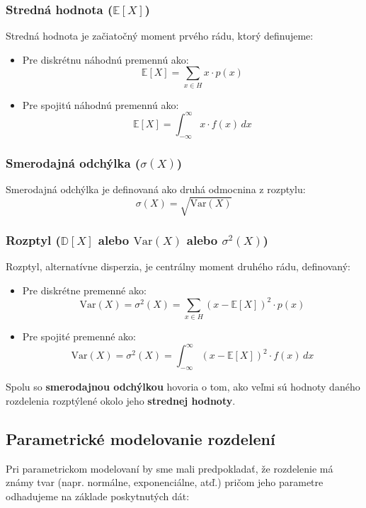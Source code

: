 \subsubsection{Stredná hodnota ($\mathbb{E}[X]$)}

Stredná hodnota je začiatočný moment prvého rádu, ktorý definujeme:

\begin{itemize}
  \item Pre diskrétnu náhodnú premennú ako:
  \[
  \mathbb{E}[X] = \sum_{x \in H} x \cdot p(x)
  \]
  \item Pre spojitú náhodnú premennú ako:
  \[
  \mathbb{E}[X] = \int_{-\infty}^{\infty} x \cdot f(x) \, dx
  \]
\end{itemize}

\subsubsection{Smerodajná odchýlka ($\sigma(X)$)}

Smerodajná odchýlka je definovaná ako druhá odmocnina z rozptylu:
\[
\sigma(X) = \sqrt{\mathrm{Var}(X)}
\]

\subsubsection{Rozptyl ($\mathbb{D}[X]$ alebo $\mathrm{Var}(X)$ alebo $\sigma^2(X)$)}

Rozptyl, alternatívne disperzia, je centrálny moment druhého rádu, definovaný:

\begin{itemize}
  \item Pre diskrétne premenné ako:
  \[
  \mathrm{Var}(X) = \sigma^2(X) = \sum_{x \in H} (x - \mathbb{E}[X])^2 \cdot p(x)
  \]
  \item Pre spojité premenné ako:
  \[
  \mathrm{Var}(X) = \sigma^2(X) = \int_{-\infty}^{\infty} (x - \mathbb{E}[X])^2 \cdot f(x) \, dx
  \]
\end{itemize}

Spolu so \textbf{smerodajnou odchýlkou} hovoria o tom, ako veľmi sú hodnoty daného rozdelenia rozptýlené okolo jeho \textbf{strednej hodnoty}.

\subsection{Parametrické modelovanie rozdelení}

Pri parametrickom modelovaní by sme mali predpokladať, že rozdelenie má známy tvar (napr. normálne, exponenciálne, atď.) pričom jeho parametre odhadujeme na základe poskytnutých dát:

